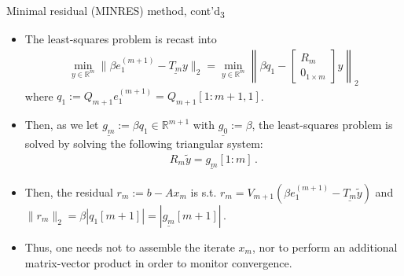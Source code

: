 \documentclass[t,usepdftitle=false]{beamer}
\begin{document}
\begin{frame}{Minimal residual (MINRES) method, cont'd\textsubscript{3}}
\begin{itemize}
\item[] The least-squares problem is recast into
\begin{align*}
\min_{y\in\mathbb{R}^m}\|\beta e_1^{(m+1)}-\underline{T_{m}}y\|_2
=\min_{y\in\mathbb{R}^m}\left\|\beta q_1-\begin{bmatrix}R_m\\0_{1\times m}\end{bmatrix}y\right\|_2
\end{align*}
where $q_1:=Q_{m+1}e_1^{(m+1)}=Q_{m+1}[1:m+1,1]$.
\item[] Then, as we let $\underline{g_m}:=\beta q_1\in\mathbb{R}^{m+1}$ with $\underline{g_0}:=\beta$, the least-squares problem is solved by solving the following triangular system:
\begin{align*}
\boxed{R_m\tilde{y}=\underline{g_m}[1:m]}\,.
\end{align*}
\item[] Then, the residual $r_m:=b-Ax_m$ is s.t. $r_m=V_{m+1}(\beta e_1^{(m+1)}-\underline{T_m}\tilde{y})$ and $\boxed{\|r_m\|_2=\beta|q_1[m+1]|=|\underline{g_m}[m+1]|}\,$.
\item[] Thus, one needs not to assemble the iterate $x_m$, nor to perform an additional matrix-vector product in order to monitor convergence.
\end{itemize}
\end{frame}
\end{document}
